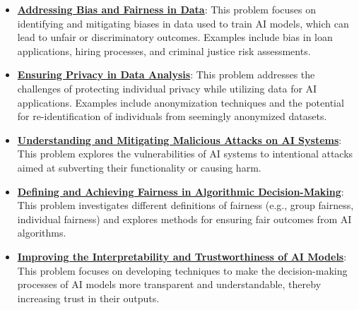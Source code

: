 \documentclass{article}%
\begin{document}
\begin{itemize}[leftmargin=*]%
\item \href{https://purdue.brightspace.com/d2l/common/assets/pdfjs-d2l-dist/1.0.14-legacy/web/viewer.html?file=\%2Fcontent\%2Fenforced\%2F1095467-wl.202510.CS.24300.001\%2F16L2-ethics.pdf\%3Fou\%3D1095467\&lang=en-us\&container=d2l-fileviewer-rendered-pdf\&fullscreen=d2l-fileviewer-rendered-pdf-dialog\&height=667#page=2}{\textbf{Addressing Bias and Fairness in Data}}: This problem focuses on identifying and mitigating biases in data used to train AI models, which can lead to unfair or discriminatory outcomes. Examples include bias in loan applications, hiring processes, and criminal justice risk assessments.%
\item \href{https://purdue.brightspace.com/d2l/common/assets/pdfjs-d2l-dist/1.0.14-legacy/web/viewer.html?file=\%2Fcontent\%2Fenforced\%2F1095467-wl.202510.CS.24300.001\%2F16L2-ethics.pdf\%3Fou\%3D1095467\&lang=en-us\&container=d2l-fileviewer-rendered-pdf\&fullscreen=d2l-fileviewer-rendered-pdf-dialog\&height=667#page=10}{\textbf{Ensuring Privacy in Data Analysis}}: This problem addresses the challenges of protecting individual privacy while utilizing data for AI applications. Examples include anonymization techniques and the potential for re-identification of individuals from seemingly anonymized datasets.%
\item \href{https://purdue.brightspace.com/d2l/common/assets/pdfjs-d2l-dist/1.0.14-legacy/web/viewer.html?file=\%2Fcontent\%2Fenforced\%2F1095467-wl.202510.CS.24300.001\%2F16L2-ethics.pdf\%3Fou\%3D1095467\&lang=en-us\&container=d2l-fileviewer-rendered-pdf\&fullscreen=d2l-fileviewer-rendered-pdf-dialog\&height=667#page=9}{\textbf{Understanding and Mitigating Malicious Attacks on AI Systems}}: This problem explores the vulnerabilities of AI systems to intentional attacks aimed at subverting their functionality or causing harm.%
\item \href{https://purdue.brightspace.com/d2l/common/assets/pdfjs-d2l-dist/1.0.14-legacy/web/viewer.html?file=\%2Fcontent\%2Fenforced\%2F1095467-wl.202510.CS.24300.001\%2F16L2-ethics.pdf\%3Fou\%3D1095467\&lang=en-us\&container=d2l-fileviewer-rendered-pdf\&fullscreen=d2l-fileviewer-rendered-pdf-dialog\&height=667#page=26}{\textbf{Defining and Achieving Fairness in Algorithmic Decision{-}Making}}: This problem investigates different definitions of fairness (e.g., group fairness, individual fairness) and explores methods for ensuring fair outcomes from AI algorithms.%
\item \href{https://purdue.brightspace.com/d2l/common/assets/pdfjs-d2l-dist/1.0.14-legacy/web/viewer.html?file=\%2Fcontent\%2Fenforced\%2F1095467-wl.202510.CS.24300.001\%2F16L2-ethics.pdf\%3Fou\%3D1095467\&lang=en-us\&container=d2l-fileviewer-rendered-pdf\&fullscreen=d2l-fileviewer-rendered-pdf-dialog\&height=667#page=28}{\textbf{Improving the Interpretability and Trustworthiness of AI Models}}: This problem focuses on developing techniques to make the decision-making processes of AI models more transparent and understandable, thereby increasing trust in their outputs.%
\end{itemize}
\end{document}
